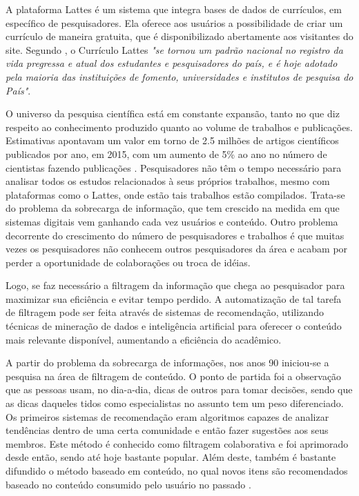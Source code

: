 \documentclass[12pt]{article}
\begin{document}
A plataforma Lattes é um sistema que integra bases de dados de currículos, em específico de pesquisadores. 
Ela oferece aos usuários a possibilidade de criar um currículo de maneira gratuita, que é disponibilizado 
abertamente aos visitantes do site. Segundo \cite{CNPq2019lattes}, o Currículo Lattes 
\textit{"se tornou um padrão nacional no registro da vida pregressa e atual dos estudantes e 
pesquisadores do país, e é hoje adotado pela maioria das instituições de fomento, universidades e 
institutos de pesquisa do País"}.
    
O universo da pesquisa científica está em constante expansão, tanto no que diz respeito ao conhecimento 
produzido quanto ao volume de trabalhos e publicações. Estimativas apontavam um valor em torno de 2.5 
milhões de artigos científicos publicados por ano, em 2015, com um aumento de 5\% ao ano no número de 
cientistas fazendo publicações \cite{ware2015stm}. Pesquisadores não têm o tempo necessário para analisar 
todos os estudos relacionados à seus próprios trabalhos, mesmo com plataformas como o Lattes, onde estão 
tais trabalhos estão compilados. Trata-se do problema da sobrecarga de informação, que tem crescido na 
medida em que sistemas digitais vem ganhando cada vez usuários e conteúdo. Outro problema decorrente do 
crescimento do número de pesquisadores e trabalhos é que muitas vezes os pesquisadores não conhecem outros 
pesquisadores da área e acabam por perder a oportunidade de colaborações ou troca de idéias.

Logo, se faz necessário a filtragem da informação que chega ao pesquisador para maximizar sua eficiência e 
evitar tempo perdido. A automatização de tal tarefa de filtragem pode ser feita através de sistemas de recomendação, 
utilizando técnicas de mineração de dados e inteligência artificial para oferecer o conteúdo mais relevante 
disponível, aumentando a eficiência do acadêmico. 

A partir do problema da sobrecarga de informações, nos anos 90 iniciou-se a pesquisa na área de filtragem de conteúdo. 
O ponto de partida foi a observação que as pessoas usam, no dia-a-dia, dicas de outros para tomar decisões, sendo que 
as dicas daqueles tidos como especialistas no assunto tem um peso diferenciado. Os primeiros sistemas de recomendação 
eram algoritmos capazes de analizar tendências dentro de uma certa comunidade e então fazer sugestões aos seus membros. 
Este método é conhecido como filtragem colaborativa e foi aprimorado desde então, sendo até hoje bastante popular. Além 
deste, também é bastante difundido o método baseado em conteúdo, no qual novos itens são recomendados baseado no 
conteúdo consumido pelo usuário no passado \cite{ricci2011introduction}.
\end{document}
